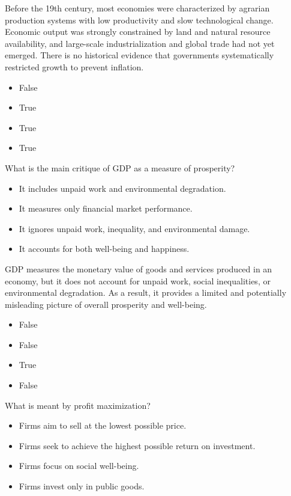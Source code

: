 \documentclass[
  a4paper,
  DIV=11,
  numbers=noendperiod,
  oneside,
  openany]{scrreprt}
\providecommand{\tightlist}{%
  \setlength{\itemsep}{0pt}\setlength{\parskip}{0pt}}
\begin{document}
Before the 19th century, most economies were characterized by agrarian
production systems with low productivity and slow technological change.
Economic output was strongly constrained by land and natural resource
availability, and large-scale industrialization and global trade had not
yet emerged. There is no historical evidence that governments
systematically restricted growth to prevent inflation.

\begin{itemize}
\tightlist
\item
  False
\item
  True
\item
  True
\item
  True
\end{itemize}

What is the main critique of GDP as a measure of prosperity?

\begin{itemize}
\tightlist
\item[$\square$]
  It includes unpaid work and environmental degradation.
\item[$\square$]
  It measures only financial market performance.
\item[$\square$]
  It ignores unpaid work, inequality, and environmental damage.
\item[$\square$]
  It accounts for both well-being and happiness.
\end{itemize}

GDP measures the monetary value of goods and services produced in an
economy, but it does not account for unpaid work, social inequalities,
or environmental degradation. As a result, it provides a limited and
potentially misleading picture of overall prosperity and well-being.

\begin{itemize}
\tightlist
\item
  False
\item
  False
\item
  True
\item
  False
\end{itemize}

What is meant by profit maximization?

\begin{itemize}
\tightlist
\item[$\square$]
  Firms aim to sell at the lowest possible price.
\item[$\square$]
  Firms seek to achieve the highest possible return on investment.
\item[$\square$]
  Firms focus on social well-being.
\item[$\square$]
  Firms invest only in public goods.
\end{itemize}
\end{document}
